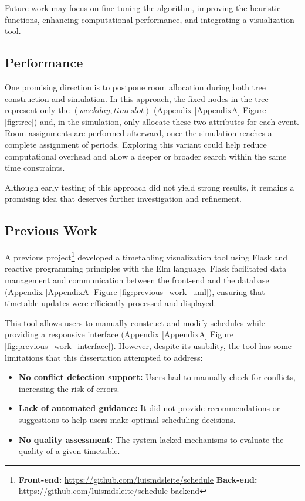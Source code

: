Future work may focus on fine tuning the algorithm, improving the heuristic functions, enhancing computational performance, and integrating a visualization tool.

\subsection{Performance}

One promising direction is to postpone room allocation during both tree construction and simulation. In this approach, the fixed nodes in the tree represent only the \((weekday, timeslot)\) (Appendix \ref{AppendixA} Figure \ref{fig:tree}) and, in the simulation, only allocate these two attributes for each event. Room assignments are performed afterward, once the simulation reaches a complete assignment of periods. Exploring this variant could help reduce computational overhead and allow a deeper or broader search within the same time constraints.

Although early testing of this approach did not yield strong results, it remains a promising idea that deserves further investigation and refinement.

\subsection{Previous Work}

A previous project\footnote{\textbf{Front-end:} \url{https://github.com/luismdsleite/schedule} \textbf{Back-end:} \url{https://github.com/luismdsleite/schedule-backend}} developed a timetabling visualization tool using Flask and reactive programming principles with the Elm language. Flask facilitated data management and communication between the front-end and the database (Appendix \ref{AppendixA} Figure \ref{fig:previous_work_uml}), ensuring that timetable updates were efficiently processed and displayed. 

This tool allows users to manually construct and modify schedules while providing a responsive interface (Appendix \ref{AppendixA} Figure \ref{fig:previous_work_interface}). However, despite its usability, the tool has some limitations that this dissertation attempted to address:

\begin{itemize}
\item \textbf{No conflict detection support:} Users had to manually check for conflicts, increasing the risk of errors.
\item \textbf{Lack of automated guidance:} It did not provide recommendations or suggestions to help users make optimal scheduling decisions.
\item \textbf{No quality assessment:} The system lacked mechanisms to evaluate the quality of a given timetable.
\end{itemize}


